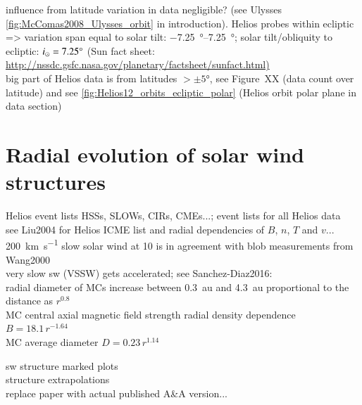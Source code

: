 influence from latitude variation in data negligible? (see Ulysses \autoref{fig:McComas2008_Ulysses_orbit} in introduction). Helios probes within ecliptic => variation span equal to solar tilt: \SIrange{-7.25}{7.25}{\degree}; solar tilt/obliquity to ecliptic: $i_\odot = 7.25\degree$ (Sun fact sheet: \url{http://nssdc.gsfc.nasa.gov/planetary/factsheet/sunfact.html)}\\
big part of Helios data is from latitudes $>\pm5$°, see Figure~XX (data count over latitude) and see \autoref{fig:Helios12_orbits_ecliptic_polar} (Helios orbit polar plane in data section)\\


\section{Radial evolution of solar wind structures}

Helios event lists HSSs, SLOWs, CIRs, CMEs...; event lists for all Helios data\\
see Liu2004 for Helios ICME list and radial dependencies of $B$, $n$, $T$ and $v$...\\

\SI{200}{\km\per\s} slow solar wind at \SI{10}{\Rs} is in agreement with blob measurements from Wang2000\\

very slow sw (VSSW) gets accelerated; see Sanchez-Diaz2016:\\


radial diameter of MCs increase between 0.3~au and 4.3~au proportional to the distance as $r^{0.8}$ \citep{Bothmer1998}\\
MC central axial magnetic field strength radial density dependence $B = 18.1\,r^{-1.64}$ \citet{Leitner2007}\\
MC average diameter $D = 0.23\,r^{1.14}$ \citet{Leitner2007}

sw structure marked plots\\

structure extrapolations\\


replace paper with actual published A\&A version...\\

\cleardoublepage
